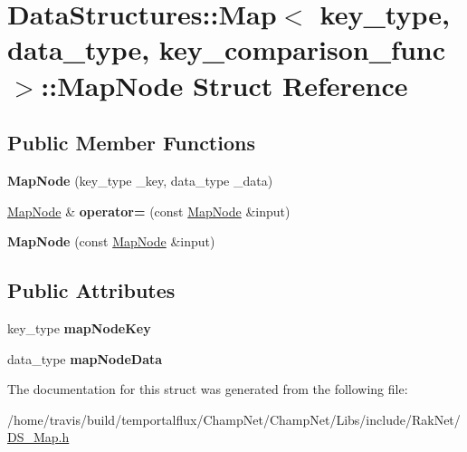 \hypertarget{struct_data_structures_1_1_map_1_1_map_node}{\section{Data\-Structures\-:\-:Map$<$ key\-\_\-type, data\-\_\-type, key\-\_\-comparison\-\_\-func $>$\-:\-:Map\-Node Struct Reference}
\label{struct_data_structures_1_1_map_1_1_map_node}
}
\subsection*{Public Member Functions}
\begin{DoxyCompactItemize}
\item 
\hypertarget{struct_data_structures_1_1_map_1_1_map_node_a20a985503a20b50231ef96c3a3f6f8eb}{{\bfseries Map\-Node} (key\-\_\-type \-\_\-key, data\-\_\-type \-\_\-data)}\label{struct_data_structures_1_1_map_1_1_map_node_a20a985503a20b50231ef96c3a3f6f8eb}

\item 
\hypertarget{struct_data_structures_1_1_map_1_1_map_node_afd59b6776d8868500d5ba38e420df786}{\hyperlink{struct_data_structures_1_1_map_1_1_map_node}{Map\-Node} \& {\bfseries operator=} (const \hyperlink{struct_data_structures_1_1_map_1_1_map_node}{Map\-Node} \&input)}\label{struct_data_structures_1_1_map_1_1_map_node_afd59b6776d8868500d5ba38e420df786}

\item 
\hypertarget{struct_data_structures_1_1_map_1_1_map_node_a51cfb66fb6174f9336b90470f0c97686}{{\bfseries Map\-Node} (const \hyperlink{struct_data_structures_1_1_map_1_1_map_node}{Map\-Node} \&input)}\label{struct_data_structures_1_1_map_1_1_map_node_a51cfb66fb6174f9336b90470f0c97686}

\end{DoxyCompactItemize}
\subsection*{Public Attributes}
\begin{DoxyCompactItemize}
\item 
\hypertarget{struct_data_structures_1_1_map_1_1_map_node_aca55378ca42d7c2d1db962237616ca35}{key\-\_\-type {\bfseries map\-Node\-Key}}\label{struct_data_structures_1_1_map_1_1_map_node_aca55378ca42d7c2d1db962237616ca35}

\item 
\hypertarget{struct_data_structures_1_1_map_1_1_map_node_a50e78c2975af586d38624a517fd56b73}{data\-\_\-type {\bfseries map\-Node\-Data}}\label{struct_data_structures_1_1_map_1_1_map_node_a50e78c2975af586d38624a517fd56b73}

\end{DoxyCompactItemize}


The documentation for this struct was generated from the following file\-:\begin{DoxyCompactItemize}
\item 
/home/travis/build/temportalflux/\-Champ\-Net/\-Champ\-Net/\-Libs/include/\-Rak\-Net/\hyperlink{_d_s___map_8h}{D\-S\-\_\-\-Map.\-h}\end{DoxyCompactItemize}

